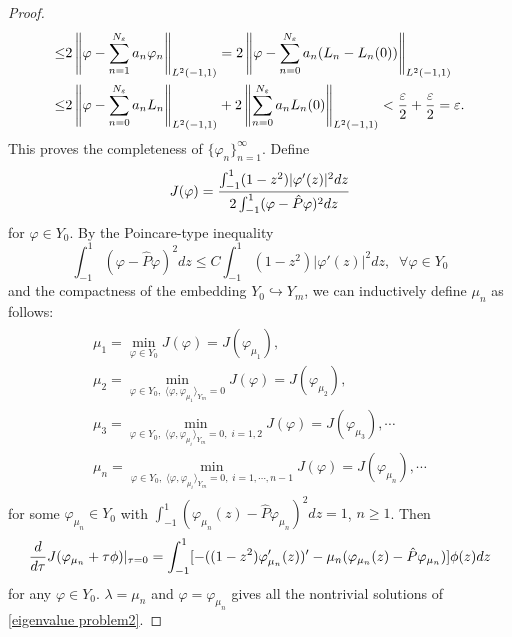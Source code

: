 \documentclass[1 [leqno, 11pt]{amsart}
\numberwithin{equation}{section}
\begin{document}
\begin{CJK*}{GBK}{song}
\begin{proof}
\begin{align}
 \leq &
2\left\|\varphi-\sum_{n=1}^{N_\varepsilon}a_n\varphi_n\right\|_{L^2(-1,1)}= 2\left\|\varphi-\sum_{n=0}^{N_\varepsilon}a_n(L_n-L_n(0))\right\|_{L^2(-1,1)}
 \\\nonumber
 \leq&
2\left\|\varphi-\sum_{n=0}^{N_\varepsilon}a_nL_n\right\|_{L^2(-1,1)}+2\left\|\sum_{n=0}^{N_\varepsilon}a_nL_n(0)\right\|_{L^2(-1,1)}<{\varepsilon\over2}+{\varepsilon
 \over2}=\varepsilon.
 \end{align}
This proves the completeness of  $\{\varphi_n\}_{n=1}^\infty$.
 Define
 $$J(\varphi)={\int_{-1}^1(1-z^2)|\varphi'(z)|^2 dz\over 2\int_{-1}^1(\varphi-\hat P \varphi)^2dz}$$
 for $\varphi\in Y_0$.
 By the Poincare-type inequality
 \begin{equation*}
 \int_{-1}^1(\varphi-\hat P \varphi)^2dz\leq C\int_{-1}^1(1-z^2)|\varphi'(z)|^2 dz,\;\;\forall \varphi\in Y_0
 \end{equation*}
 and the compactness of the embedding $Y_0\hookrightarrow Y_m$, we can inductively define $\mu_n$  as follows:
  \begin{equation*}\begin{aligned}\begin{array}{llll}
  \mu_1=\min\limits_{\varphi\in Y_0}J(\varphi)=J(\varphi_{\mu_1}),\\
  \mu_2=\min\limits_{\varphi\in Y_0,\;\langle\varphi,\varphi_{\mu_1}\rangle_{Y_m}=0}J(\varphi)=J(\varphi_{\mu_2}),\\
  \mu_3=\min\limits_{\varphi\in Y_0,\;\langle\varphi,\varphi_{\mu_i}\rangle_{Y_m}=0,\;i=1,2}J(\varphi)=J(\varphi_{\mu_3}),\cdots\\
  \mu_n=\min\limits_{\varphi\in Y_0,\;\langle\varphi,\varphi_{\mu_i}\rangle_{Y_m}=0,\;i=1,\cdots,n-1}J(\varphi)=J(\varphi_{\mu_n}),\cdots
  \end{array}
\end{aligned}
   \end{equation*}
for some  $\varphi_{\mu_n}\in Y_0$ with $\int_{-1}^1(\varphi_{\mu_n}(z)-\hat P\varphi_{\mu_n})^2dz=1$, $n\geq1$. Then
\begin{equation*}
{d\over d\tau}J(\varphi_{\mu_n}+\tau \phi)|_{\tau=0}=\int_{-1}^1[-((1-z^2)\varphi'_{\mu_n}(z))'-\mu_n(\varphi_{\mu_n}(z)-\hat P\varphi_{\mu_n})]\phi (z) dz
\end{equation*}
for any $\varphi\in Y_0$.   $\lambda=\mu_n$ and  $\varphi=\varphi_{\mu_n}$ gives all the nontrivial  solutions of  \eqref{eigenvalue problem2}.

\end{proof}
\end{CJK*}
\end{document}
